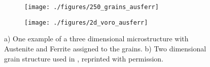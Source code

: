 \documentclass[crystal_plast.tex]{subfiles}
\begin{document}
 \begin{figure}
\centering
\begin{subfigure}{.5\textwidth}
  \centering
  \texttt{[image: ./figures/250\_grains\_ausferr]}
  \caption{}
  \label{fig:ausferr_3d}
\end{subfigure}%
\begin{subfigure}{.6\textwidth}
  \centering
  \texttt{[image: ./figures/2d\_voro\_ausferr]}
  \caption{}
  \label{fig:ausferr_2d}
\end{subfigure}
\caption{a) One example of a three dimensional microstructure with Austenite and Ferrite assigned to the grains.  b) Two dimensional grain structure used in \cite{lillbacka2007multiscale}, reprinted with permission.}
\label{fig:ausferr}
\end{figure}


%
%
\end{document}
